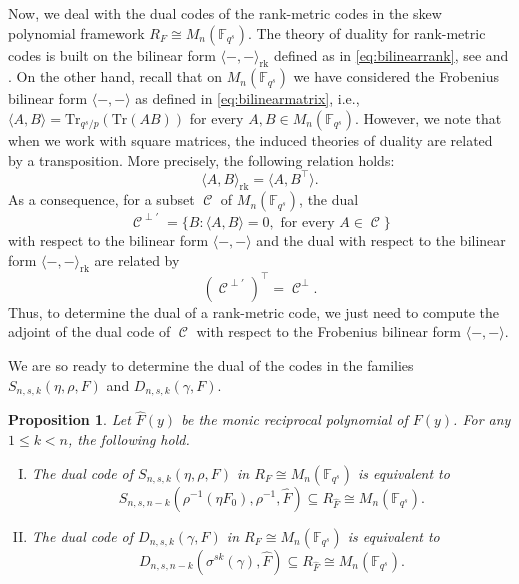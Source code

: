 \documentclass[a4paper, 11pt]{article}
\DeclareMathOperator{\C}{\mathcal{C}}
\DeclareMathOperator{\rk}{rk}
\newtheorem{proposition}[theorem]{Proposition}
\newcommand{\F}{{\mathbb F}}
\newcommand{\Tr}{{\mathrm{Tr}}}
\begin{document}
Now, we deal with the dual codes of the rank-metric codes in the skew polynomial framework $R_F \cong M_n(\F_{q^s})$. The theory of duality for rank-metric codes is built on the bilinear form $\langle -,-\rangle_{\rk}$ defined as in \eqref{eq:bilinearrank}, see \cite[\S 3]{delsarte1978bilinear} and \cite[\S 1.5]{sheekey2016new}. On the other hand, recall that on $M_n(\F_{q^s})$ we have considered the Frobenius bilinear form $\langle -,- \rangle$ as defined in \eqref{eq:bilinearmatrix}, i.e., $\langle A,B \rangle = \Tr_{q^s/p}(\Tr(AB))$ for every $A,B \in M_n(\F_{q^s})$. However, we note that when we work with square matrices, the induced theories of duality are related by a transposition. More precisely, the following relation holds:
\[
\langle A,B \rangle_{\rk}=\langle A,B^{\top} \rangle.
\]
As a consequence, for a subset $\C$ of $M_n(\F_{q^s})$, the dual 
\[
\C^{\perp'}=\{B \colon \langle A, B \rangle=0, \mbox{ for every } A \in \C\}\]
with respect to the bilinear form $\langle -,- \rangle$ and the dual with respect to the bilinear form $\langle -,- \rangle_{\rk}$ are related by 
\begin{equation} \label{eq:relationduals}
(\C^{\perp'})^{\top} = \C^{\perp}.\end{equation} Thus, to determine the dual of a rank-metric code, we just need to compute the adjoint of the dual code of $\C$ with respect to the Frobenius bilinear form $\langle -,- \rangle$.

We are so ready to determine the dual of the codes in the families $S_{n,s,k}(\eta,\rho,F)$ and $D_{n,s,k}(\gamma,F)$. 

\begin{proposition} \label{prop:determinantiondual}
 Let $\hat{F}(y)$ be the monic reciprocal polynomial of $F(y)$. For any $1 \leq k<n$, the following hold. 

\begin{enumerate}[I)]
    \item\label{dualS} The dual code of $S_{n,s,k}(\eta,\rho,F)$ in $R_F \cong M_n(\F_{q^s})$ is equivalent to
 \[
 S_{n,s,n-k}(\rho^{-1}(\eta F_0), \rho^{-1},\hat{F}) \subseteq R_{\hat{F}} \cong M_n(\F_{q^s}).
 \]
 \item\label{dualD} The dual code of  $D_{n,s,k}(\gamma,F)$  in $R_F \cong M_n(\F_{q^s})$ is equivalent to
 \[D_{n,s,n-k}(\sigma^{sk}(\gamma),\hat{F}) \subseteq R_{\hat{F}} \cong M_n(\F_{q^s}).
 \]
 \end{enumerate}
\end{proposition}
\end{document}
